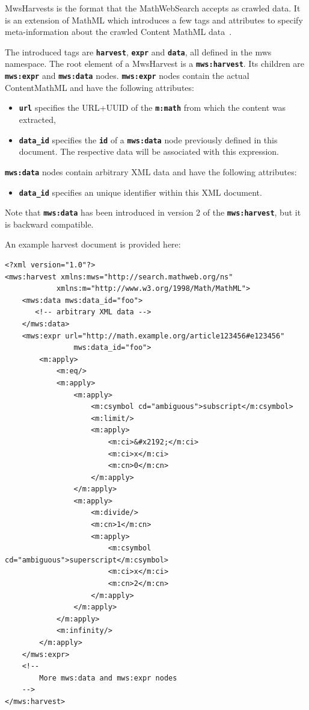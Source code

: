 \documentclass{deliverablereport}
\begin{document}
MwsHarvests is the format that the MathWebSearch accepts as crawled data. It is an
extension of MathML which introduces a few tags and attributes to specify meta-information
about the crawled Content MathML data~\cite{MWSH}.

The introduced tags are \textbf{\texttt{harvest}}, \textbf{\texttt{expr}} and
\textbf{\texttt{data}}, all defined in the mws namespace. The root element of a MwsHarvest
is a \textbf{\texttt{mws:harvest}}. Its children are \textbf{\texttt{mws:expr}} and
\textbf{\texttt{mws:data}} nodes. \textbf{\texttt{mws:expr}} nodes contain the actual
ContentMathML and have the following attributes:

\begin{itemize}
\item \textbf{\texttt{url}} specifies the URL+UUID of the \textbf{\texttt{m:math}} from
  which the content was extracted,
\item \textbf{\texttt{data\_id}} specifies the \textbf{\texttt{id}} of a
  \textbf{\texttt{mws:data}} node previously defined in this document. The respective data
  will be associated with this expression.
\end{itemize}

\textbf{\texttt{mws:data}} nodes contain arbitrary XML data and have the following
attributes:
\begin{itemize}
\item \textbf{\texttt{data\_id}} specifies an unique identifier within this XML document.
\end{itemize}

Note that \textbf{\texttt{mws:data}} has been introduced in version 2 of the
\textbf{\texttt{mws:harvest}}, but it is backward compatible.

An example harvest document is provided here:

\lstset{language=XML,basicstyle=\footnotesize\sf}
\begin{lstlisting}
<?xml version="1.0"?>
<mws:harvest xmlns:mws="http://search.mathweb.org/ns" 
			xmlns:m="http://www.w3.org/1998/Math/MathML">
    <mws:data mws:data_id="foo">
       <!-- arbitrary XML data -->
    </mws:data>
    <mws:expr url="http://math.example.org/article123456#e123456"
    			mws:data_id="foo">
        <m:apply>
            <m:eq/>
            <m:apply>
                <m:apply>
                    <m:csymbol cd="ambiguous">subscript</m:csymbol>
                    <m:limit/>
                    <m:apply>
                        <m:ci>&#x2192;</m:ci>
                        <m:ci>x</m:ci>
                        <m:cn>0</m:cn>
                    </m:apply>
                </m:apply>
                <m:apply>
                    <m:divide/>
                    <m:cn>1</m:cn>
                    <m:apply>
                        <m:csymbol cd="ambiguous">superscript</m:csymbol>
                        <m:ci>x</m:ci>
                        <m:cn>2</m:cn>
                    </m:apply>
                </m:apply>
            </m:apply>
            <m:infinity/>
        </m:apply>
    </mws:expr>
    <!--
        More mws:data and mws:expr nodes
    -->
</mws:harvest>
\end{lstlisting}
\end{document}
